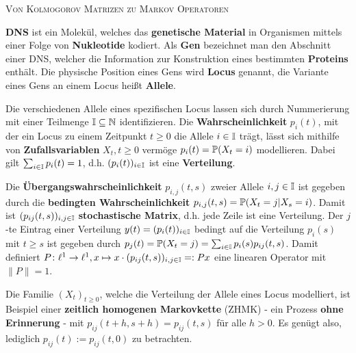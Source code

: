 \documentclass[a4paper]{paper}
\begin{document}
\pagestyle{fancy}
\fancyhf{}
\fancyfoot[R]{}
\renewcommand{\headrulewidth}{0.5pt}
\renewcommand{\footrulewidth}{0.5pt}
\setcounter{section}{1}
\vspace{-50px}

\begin{center}
\large\textsc{Von Kolmogorov Matrizen zu Markov Operatoren}
\end{center}
\textbf{DNS} ist ein Molekül, welches das \textbf{genetische Material} in Organismen mittels einer Folge von \textbf{Nukleotide} kodiert. Als \textbf{Gen} bezeichnet man den Abschnitt einer DNS, welcher die Information zur Konstruktion eines bestimmten \textbf{Proteins} enthält. Die physische Position eines Gens  wird \textbf{Locus} genannt, die Variante eines Gens an einem Locus heißt  \textbf{Allele}.\par Die verschiedenen Allele eines spezifischen Locus lassen sich durch Nummerierung mit einer Teilmenge $\mathbb I\subseteq \N$ identifizieren. Die \textbf{Wahrscheinlichkeit} $p_i(t)$, mit der ein  Locus zu einem Zeitpunkt $t\geq 0$ die Allele $i\in\I$ trägt, lässt sich mithilfe von   \textbf{Zufallsvariablen} $X_t, t\geq0$ vermöge $p_i(t)=\P(X_t=i)$ modellieren. Dabei gilt $\sum_{i\in\I}p_i(t)=1$, d.h. $(p_i(t))_{i\in\I}$ ist eine \textbf{Verteilung}.

\par Die \textbf{Übergangswahrscheinlichkeit} $p_{i,j}(t,s)$ zweier Allele $i,j\in\I$ ist gegeben  durch die \textbf{bedingten Wahrscheinlichkeit} $p_{i,j}(t,s)=\P(X_t=j|X_s=i)$. Damit ist $(p_{ij}(t,s))_{i,j\in\I}$ \textbf{stochastische Matrix},  d.h. jede Zeile ist eine Verteilung. Der  $j$-te Eintrag einer Verteilung $y(t)=(p_i(t))_{i\in\I}$ bedingt auf die Verteilung $p_i(s)$ mit $t\geq s$ ist gegeben durch $p_j(t)=\P(X_t=j)=\sum_{i\in\I}p_i(s) p_{ij}(t,s)$. Damit definiert $P\colon \ell^1\to\ell^1, x\mapsto x\cdot(p_{ij}(t,s))_{i,j\in\I}=:Px$ eine linearen Operator mit $\|P\|=1$.
\par Die Familie $(X_t)_{t\geq0}$, welche die Verteilung der Allele eines Locus modelliert, ist Beispiel einer \textbf{zeitlich homogenen Markovkette} (ZHMK) - ein Prozess \textbf{ohne Erinnerung} - mit $p_{ij}(t+h,s+h)=p_{ij}(t,s)$ für alle $h>0$. Es genügt also, lediglich $p_{ij}(t):=p_{ij}(t,0)$ zu betrachten.
\end{document}
